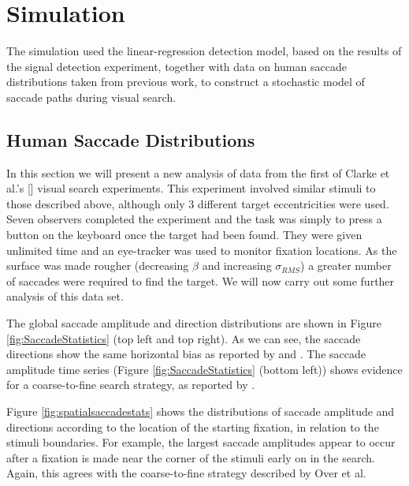 \section{Simulation}
The simulation used the linear-regression detection model, based on the results of the signal detection experiment, together with data on human saccade distributions taken from previous work, to construct a stochastic model of saccade paths during visual search.

\subsection{Human Saccade Distributions}

In this section we will present a new analysis of data from the first of Clarke et al.'s [\citeyear{clarke2009}] visual search experiments. This experiment involved similar stimuli to those described above, although only 3 different target eccentricities were used. Seven observers completed the experiment and the task was simply to press a button on the keyboard once the target had been found. They were given unlimited time and an eye-tracker was used to monitor fixation locations. As the surface was made rougher (decreasing $\beta$ and increasing $\sigma_{RMS}$) a greater number of saccades were required to find the target. We will now carry out some further analysis of this data set. 

\par

The global saccade amplitude and direction distributions are shown in Figure \ref{fig:SaccadeStatistics} (top left and top right). As we can see, the saccade directions show the same horizontal bias as reported by \cite{gilchrist-harvey2006} and \cite{najemnik-geisler2008}. The saccade amplitude time series (Figure \ref{fig:SaccadeStatistics} (bottom left)) shows evidence for a coarse-to-fine search strategy, as reported by \cite{over2007}. 
\par
Figure \ref{fig:spatialsaccadestats} shows the distributions of saccade amplitude and directions according to the location of the starting fixation, in relation to the stimuli boundaries. For example, the largest saccade amplitudes appear to occur after a fixation is made near the corner of the stimuli early on in the search. Again, this agrees with the coarse-to-fine strategy described by Over et al. 
 

